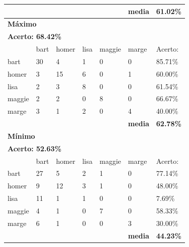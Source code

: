 \documentclass[journal]{IEEEtran}
\begin{document}
\begin{table}[!htb]
\begin{tabular}{l|l|l|l|l|l|l}
\textbf{} & \textbf{} & \textbf{} & \textbf{} & \textbf{} & \textbf{media} & \textbf{61.02\%} \\ \hline
\multicolumn{7}{l}{\textbf{Máximo}}                                                            \\ \hline
\multicolumn{7}{l}{\textbf{Acerto: 68.42\%}}                                                  \\ \hline
          & bart      & homer     & lisa      & maggie    & marge          & Acerto:            \\ \hline
bart      & 30        & 4         & 1         & 0         & 0              & 85.71\%          \\ \hline
homer     & 3         & 15        & 6         & 0         & 1              & 60.00\%          \\ \hline
lisa      & 2         & 3         & 8         & 0         & 0              & 61.54\%          \\ \hline
maggie    & 2         & 2         & 0         & 8         & 0              & 66.67\%          \\ \hline
marge     & 3         & 1         & 2         & 0         & 4              & 40.00\%          \\ \hline
\textbf{} & \textbf{} & \textbf{} & \textbf{} & \textbf{} & \textbf{media} & \textbf{62.78\%} \\ \hline
\multicolumn{7}{l}{\textbf{Mínimo}}                                                            \\ \hline
\multicolumn{7}{l}{\textbf{Acerto: 52.63\%}}                                                  \\ \hline
          & bart      & homer     & lisa      & maggie    & marge          & Acerto:            \\ \hline
bart      & 27        & 5         & 2         & 1         & 0              & 77.14\%          \\ \hline
homer     & 9         & 12        & 3         & 1         & 0              & 48.00\%          \\ \hline
lisa      & 11        & 1         & 1         & 0         & 0              & 7.69\%           \\ \hline
maggie    & 4         & 1         & 0         & 7         & 0              & 58.33\%          \\ \hline
marge     & 6         & 1         & 0         & 0         & 3              & 30.00\%          \\ \hline
\textbf{} & \textbf{} & \textbf{} & \textbf{} & \textbf{} & \textbf{media} & \textbf{44.23\%} \\ \hline

\end{tabular}
\end{table}
\end{document}
